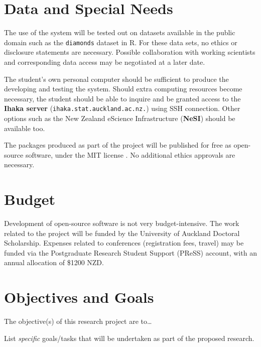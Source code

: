 \documentclass[12pt,a4paper]{article}
\begin{document}
\section{Data and Special Needs}
\label{sec:data}

The use of the system will be tested out on datasets available in the public domain such as the \texttt{diamonds} dataset in R. For these data sets, no ethics or disclosure statements are necessary. Possible collaboration with working scientists and corresponding data access may be negotiated at a later date.  

The student's own personal computer should be sufficient to produce the developing and testing the system. Should extra computing resources become necessary, the student should be able to inquire and be granted access to the \textbf{Ihaka server} (\texttt{ihaka.stat.auckland.ac.nz.}) using SSH connection. Other options such as the New Zealand eScience Infrastructure (\textbf{NeSI}) should be available too. 

The packages produced as part of the project will be published for free as open-source software, under the MIT license \citep{mit2023}. No additional ethics approvals are necessary. 

\section{Budget}

Development of open-source software is not very budget-intensive. The work related to the project will be funded by the University of Auckland Doctoral Scholarship. Expenses related to conferences (registration fees, travel) may be funded via the Postgraduate Research Student Support (PReSS) account, with an annual allocation of \$1200 NZD. 

\section{Objectives and Goals}



The objective(s) of this research project are to\ldots



List \textit{specific} goals/tasks that
will be undertaken as part of the proposed research.
\end{document}
